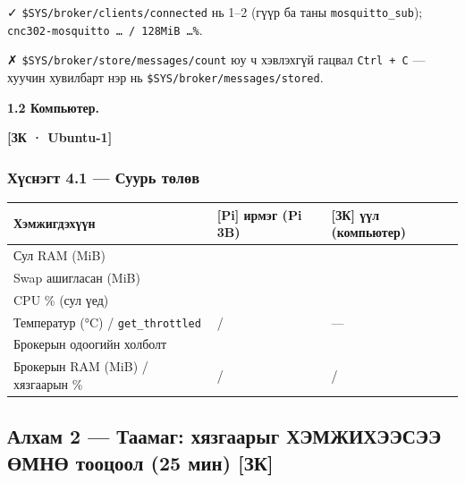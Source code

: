 ✓ \texttt{\$SYS/\allowbreak{}broker/\allowbreak{}clients/\allowbreak{}connected} нь 1--2 (гүүр ба таны \texttt{mosquitto\_sub}); \texttt{cnc302-mosquitto\ \ldots{}\ /\allowbreak{}\ 128MiB\ \ldots{}\%}.

✗ \texttt{\$SYS/\allowbreak{}broker/\allowbreak{}store/\allowbreak{}messages/\allowbreak{}count} юу ч хэвлэхгүй гацвал \texttt{Ctrl\ +\ C} --- хуучин хувилбарт нэр нь \texttt{\$SYS/\allowbreak{}broker/\allowbreak{}messages/\allowbreak{}stored}.

\textbf{1.2 Компьютер.}

\textbf{{[}ЗК · Ubuntu-1{]}}

\begin{Shaded}
\begin{Highlighting}[]
\KeywordTok{|} 
\end{Highlighting}
\end{Shaded}

\hypertarget{ux445ux4afux441ux43dux44dux433ux442-4.1-ux441ux443ux443ux440ux44c-ux442ux4e9ux43bux4e9ux432}{%
\subsubsection{Хүснэгт 4.1 --- Суурь төлөв}\label{ux445ux4afux441ux43dux44dux433ux442-4.1-ux441ux443ux443ux440ux44c-ux442ux4e9ux43bux4e9ux432}}

\begingroup\scriptsize\begin{longtable}[]{@{}lll@{}}
\toprule
Хэмжигдэхүүн & {[}Pi{]} ирмэг (Pi 3B) & {[}ЗК{]} үүл (компьютер)\tabularnewline
\midrule
\endhead
Сул RAM (MiB) & &\tabularnewline
Swap ашигласан (MiB) & &\tabularnewline
CPU \% (сул үед) & &\tabularnewline
Температур (°C) / \texttt{get\_throttled} & / & ---\tabularnewline
Брокерын одоогийн холболт & &\tabularnewline
Брокерын RAM (MiB) / хязгаарын \% & / & /\tabularnewline
\bottomrule
\end{longtable}\endgroup

\hypertarget{ux430ux43bux445ux430ux43c-2-ux442ux430ux430ux43cux430ux433-ux445ux44fux437ux433ux430ux430ux440ux44bux433-ux445ux44dux43cux436ux438ux445ux44dux44dux441ux44dux44d-ux4e9ux43cux43dux4e9-ux442ux43eux43eux446ux43eux43eux43b-25-ux43cux438ux43d-ux437ux43a}{%
\subsection{Алхам 2 --- Таамаг: хязгаарыг ХЭМЖИХЭЭСЭЭ ӨМНӨ тооцоол (25 мин) {[}ЗК{]}}\label{ux430ux43bux445ux430ux43c-2-ux442ux430ux430ux43cux430ux433-ux445ux44fux437ux433ux430ux430ux440ux44bux433-ux445ux44dux43cux436ux438ux445ux44dux44dux441ux44dux44d-ux4e9ux43cux43dux4e9-ux442ux43eux43eux446ux43eux43eux43b-25-ux43cux438ux43d-ux437ux43a}}


